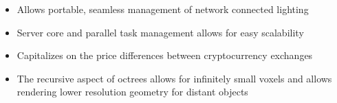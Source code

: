 \documentclass[10pt,letterpaper]{altacv}
\begin{document}

\begin{itemize}
\item Allows portable, seamless management of network connected lighting
\item Server core and parallel task management allows for easy scalability
\end{itemize}

\divider

\begin{itemize}
\item Capitalizes on the price differences between cryptocurrency exchanges
\end{itemize}

\divider

\begin{itemize}
\item The recursive aspect of octrees allows for infinitely small voxels and allows rendering lower resolution geometry for distant objects
\end{itemize}






\clearpage

\end{document}
